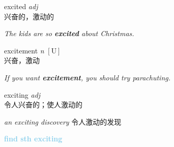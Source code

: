 \item[] {
    \lettrine{excited}{}  
    \textit{adj} \\
    兴奋的，激动的

    \textit{The kids are so \textbf{excited} about Christmas.}

} 

\item[] {
    \lettrine{excitement}{}  
    \textit{n} 
    $\mathrm{[U]}$ \\
    兴奋，激动

    \textit{If you want \textbf{excitement}, you should try parachuting.}

} 

\item[] {
    \lettrine{exciting}{}  
    \textit{adj} \\
    令人兴奋的；使人激动的

    \textit{an exciting discovery} 令人激动的发现

    \textbf {
        \textcolor{SkyBlue} {
            find sth exciting
        }
    }

} 